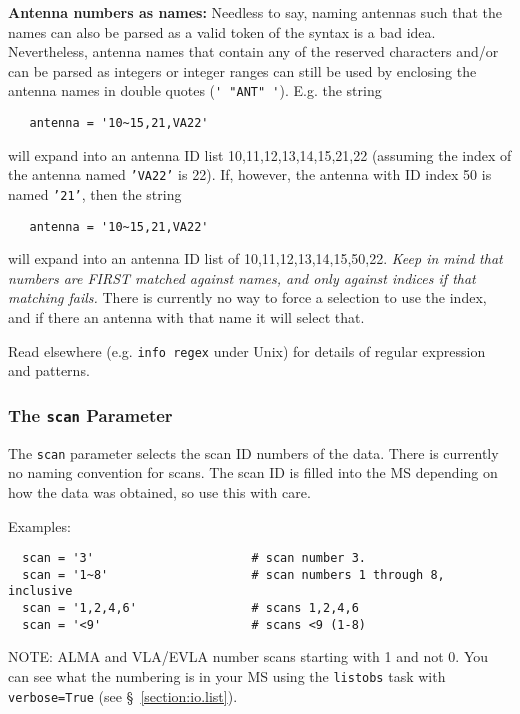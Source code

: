 {\bf Antenna numbers as names:}
Needless to say, naming antennas such that the names can also be
parsed as a valid token of the syntax is a bad idea.  Nevertheless,
antenna names that contain any of the reserved characters and/or can be
parsed as integers or integer ranges can still be used by enclosing
the antenna names in double quotes ({\verb!' "ANT" '!}).  E.g. the string
\small
\begin{verbatim}
   antenna = '10~15,21,VA22'
\end{verbatim}
\normalsize
will expand into an antenna ID list 10,11,12,13,14,15,21,22 (assuming
the index of the antenna named {\tt 'VA22'} is 22).  
If, however, the antenna with ID index 50 is named {\tt '21'}, then
the string 
\small
\begin{verbatim}
   antenna = '10~15,21,VA22'
\end{verbatim}
\normalsize
will expand into an antenna ID list of 10,11,12,13,14,15,50,22.
{\em Keep in mind that numbers are FIRST matched against
names, and only against indices if that matching fails.}
There is currently no way to force a selection to use the index, and
if there an antenna with that name it will select that.

Read elsewhere (e.g. {\tt info regex} under Unix) for details of
regular expression and patterns.

\subsubsection{The {\tt scan} Parameter}
\label{section:io.selection.selectdata.scan}

The {\tt scan} parameter selects the scan ID numbers of the data.
There is currently no naming convention for scans.  The scan ID
is filled into the MS depending on how the data was obtained,
so use this with care.

Examples:
\small
\begin{verbatim}
  scan = '3'                      # scan number 3.
  scan = '1~8'                    # scan numbers 1 through 8, inclusive
  scan = '1,2,4,6'                # scans 1,2,4,6
  scan = '<9'                     # scans <9 (1-8)
\end{verbatim}
\normalsize

NOTE: ALMA and VLA/EVLA number scans starting with 1
and not 0.  You can see what the numbering is in your MS using
the {\tt listobs} task with {\tt verbose=True} (see
\S~\ref{section:io.list}).

